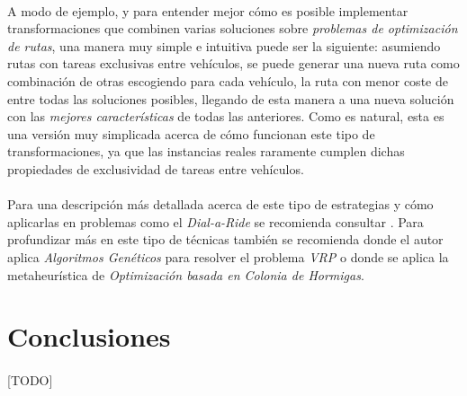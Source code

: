 \documentclass{subfiles}
\begin{document}
      \paragraph{}
      A modo de ejemplo, y para entender mejor cómo es posible implementar transformaciones que combinen varias soluciones sobre \emph{problemas de optimización de rutas}, una manera muy simple e intuitiva puede ser la siguiente: asumiendo rutas con tareas exclusivas entre vehículos, se puede generar una nueva ruta como combinación de otras escogiendo para cada vehículo, la ruta con menor coste de entre todas las soluciones posibles, llegando de esta manera a una nueva solución con las \emph{mejores características} de todas las anteriores. Como es natural, esta es una versión muy simplicada acerca de cómo funcionan este tipo de transformaciones, ya que las instancias reales raramente cumplen dichas propiedades de exclusividad de tareas entre vehículos.

      \paragraph{}
      Para una descripción más detallada acerca de este tipo de estrategias y cómo aplicarlas en problemas como el \emph{Dial-a-Ride} se recomienda consultar \cite{jorgensen2007solving}. Para profundizar más en este tipo de técnicas también se recomienda \cite{baker2003genetic} donde el autor aplica \emph{Algoritmos Genéticos} para resolver el problema \emph{VRP} o \cite{bell2004ant} donde se aplica la metaheurística de \emph{Optimización basada en Colonia de Hormigas}.

    \section{Conclusiones}
    \label{sec:solving_conclusions}

      \paragraph{}
      [TODO]
\end{document}
